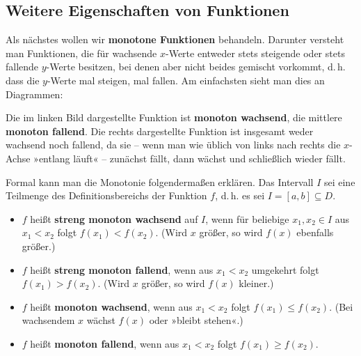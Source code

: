 \subsection{Weitere Eigenschaften von Funktionen}

Als nächstes wollen wir \textbf{monotone Funktionen} behandeln. Darunter versteht man Funktionen, die für wachsende $x$-Werte entweder stets steigende oder stets fallende $y$-Werte besitzen, bei denen aber nicht beides gemischt vorkommt, d.\,h. dass die $y$-Werte mal steigen, mal fallen. Am einfachsten sieht man dies an Diagrammen:

\begin{center}
\end{center}

Die im linken Bild dargestellte Funktion ist \textbf{monoton wachsend}, die mittlere \textbf{monoton fallend}. Die rechts dargestellte Funktion ist insgesamt weder wachsend noch fallend, da sie -- wenn man wie üblich von links nach rechts die $x$-Achse »entlang läuft« -- zunächst fällt, dann wächst und schließlich wieder fällt.

Formal kann man die Monotonie folgendermaßen erklären. Das Intervall $I$ sei eine Teilmenge des Definitionsbereichs der Funktion $f$, d.\,h. es sei $I = [a,b] \subseteq D$.
\begin{itemize}
  \item $f$ heißt \textbf{streng monoton wachsend} auf $I$, wenn für beliebige $x_1, x_2 \in I$ aus $x_1 < x_2$ folgt $f(x_1) < f(x_2)$. (Wird $x$ größer, so wird $f(x)$ ebenfalls größer.)
  \item $f$ heißt \textbf{streng monoton fallend}, wenn aus $x_1 < x_2$ umgekehrt folgt $f(x_1) > f(x_2)$. (Wird $x$ größer, so wird $f(x)$ kleiner.)
  \item $f$ heißt \textbf{monoton wachsend}, wenn aus $x_1 < x_2$ folgt $f(x_1) \leq f(x_2)$. (Bei wachsendem $x$ wächst $f(x)$ oder »bleibt stehen«.)
  \item $f$ heißt \textbf{monoton fallend}, wenn aus $x_1 < x_2$ folgt $f(x_1) \geq f(x_2)$.
\end{itemize}

